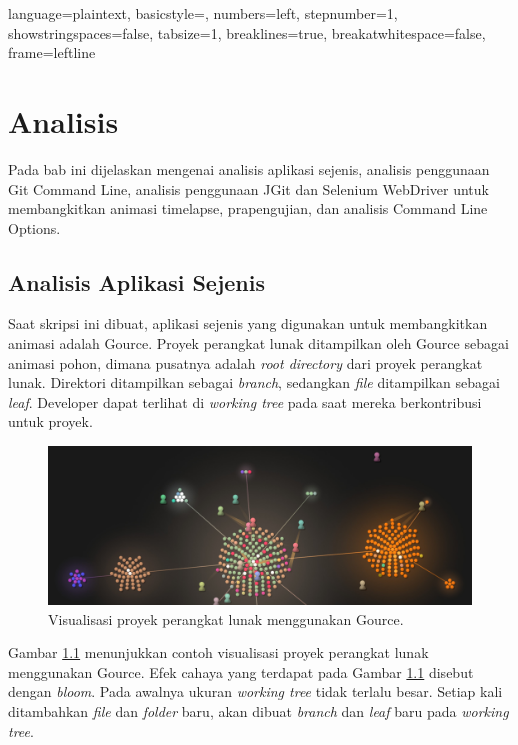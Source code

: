 
\lstset
{ 
    language=plaintext,
    basicstyle=\footnotesize,
    numbers=left,
    stepnumber=1,
    showstringspaces=false,
    tabsize=1,
    breaklines=true,
    breakatwhitespace=false,
    frame=leftline
}

\chapter{Analisis}
\label{chap:analisis}
Pada bab ini dijelaskan mengenai analisis aplikasi sejenis, analisis penggunaan Git Command Line, analisis penggunaan JGit dan Selenium WebDriver untuk membangkitkan animasi timelapse, prapengujian, dan analisis Command Line Options. 

\section{Analisis Aplikasi Sejenis}
\label{sec:analisis_aplikasi_sejenis}
Saat skripsi ini dibuat, aplikasi sejenis yang digunakan untuk membangkitkan animasi adalah Gource.  
Proyek perangkat lunak ditampilkan oleh Gource sebagai animasi pohon, dimana pusatnya adalah \textit{root directory} dari proyek perangkat lunak\cite{Gource}. Direktori ditampilkan sebagai \textit{branch}, sedangkan \textit{file} ditampilkan sebagai \textit{leaf}. Developer dapat terlihat di \textit{working tree} pada saat mereka berkontribusi untuk proyek.

\begin{figure}[H]
	\centering
		\includegraphics[scale=0.2]{Gambar/gource.jpg}
	\caption{Visualisasi proyek perangkat lunak menggunakan Gource.}
	\label{fig:gource}
\end{figure}

Gambar \ref{fig:gource} menunjukkan contoh visualisasi proyek perangkat lunak menggunakan Gource. Efek cahaya yang terdapat pada Gambar \ref{fig:gource} disebut dengan \textit{bloom}. Pada awalnya ukuran \textit{working tree} tidak terlalu besar. Setiap kali ditambahkan \textit{file} dan \textit{folder} baru, akan dibuat \textit{branch} dan \textit{leaf} baru pada \textit{working tree}.  

